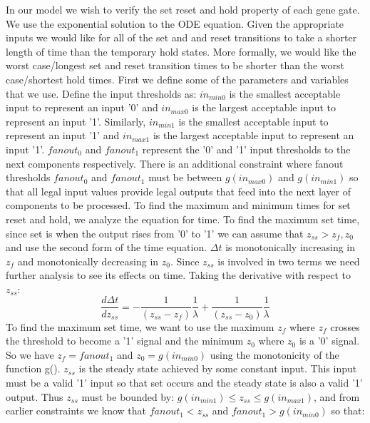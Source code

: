 \documentclass{article}
\begin{document}
\newline  \newline
In our model we wish to verify the set reset and hold property of each gene gate.  We use the exponential solution to the ODE equation.  Given the appropriate inputs we would like for all of the set and and reset transitions to take a shorter length of time than the temporary hold states.  More formally, we would like the worst case/longest set and reset transition times to be shorter than the worst case/shortest hold times.  First we define some of the parameters and variables that we use.  Define the input thresholds as:  $in_{min0}$ is the smallest acceptable input to represent an input '0' and $in_{max0}$ is the largest acceptable input to represent an input '1'.  Similarly, $in_{min1}$ is the smallest acceptable input to represent an input '1' and $in_{max1}$ is the largest acceptable input to represent an input '1'.  $fanout_0$ and $fanout_1$ represent the '0' and '1' input thresholds to the next components respectively.  There is an additional constraint where fanout thresholds $fanout_0$ and $fanout_1$ must be between $g(in_{max0})$ and $g(in_{min1})$ so that all legal input values provide legal outputs that feed into the next layer of components to be processed.
\newline \newline
To find the maximum and minimum times for set reset and hold, we analyze the equation for time.  To find the maximum set time, since set is when the output rises from '0' to '1' we can assume that $z_{ss}>z_f, z_0$ and use the second form of the time equation. $\Delta t$ is monotonically increasing in $z_f$ and monotonically decreasing in $z_0$.  Since $z_{ss}$ is involved in two terms we need further analysis to see its effects on time.  Taking the derivative with respect to $z_{ss}$:
\[\frac{d\Delta t}{dz_{ss}}=- \frac{1}{(z_{ss}-z_f)}\frac{1}{\lambda}+ \frac{1}{(z_{ss}-z_0)}\frac{1}{\lambda}
\]
To find the maximum set time, we want to use the maximum $z_f$ where $z_f$ crosses the threshold to become a '1' signal and the minimum $z_0$ where $z_0$ is a '0' signal.  So we have $z_f=fanout_1$ and $z_0=g(in_{min0})$ using the monotonicity of the function g().  $z_{ss}$ is the steady state achieved by some constant input.  This input must be a valid '1' input so that set occurs and the steady state is also a valid '1' output.  Thus $z_{ss}$ must be bounded by: $g(in_{min1})\leq z_{ss}\leq g(in_{max1})$, and from earlier constraints we know that $fanout_1<z_{ss}$ and $fanout_1>g(in_{min0})$ so that:
\end{document}
